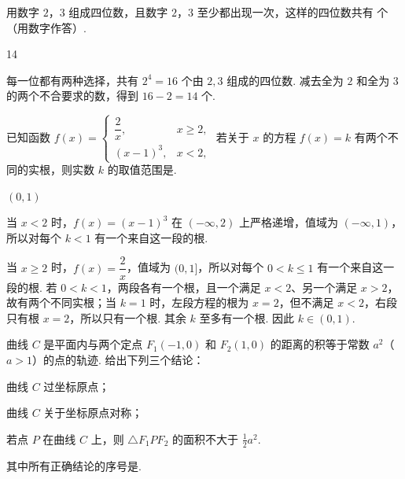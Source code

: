 \begin{problem}
用数字 \(2\)，\(3\) 组成四位数，且数字 \(2\)，\(3\) 至少都出现一次，这样的四位数共有\fillinblank{} 个（用数字作答）.
\end{problem}

\begin{answer}
14
\end{answer}

\begin{solution}
每一位都有两种选择，共有 \(2^4=16\) 个由 \(2,3\) 组成的四位数. 减去全为 \(2\) 和全为 \(3\) 的两个不合要求的数，得到 \(16-2=14\) 个.
\end{solution}

\begin{problem}
已知函数 \(f(x) = \begin{cases}
\dfrac{2}{x}, & x \geqslant 2,\\
(x - 1)^3, & x < 2,
\end{cases}\)
若关于 \(x\) 的方程 \(f(x) = k\) 有两个不同的实根，则实数 \(k\) 的取值范围是\fillinblank{}.
\end{problem}

\begin{answer}
\((0, 1)\)
\end{answer}

\begin{solution}
当 \(x<2\) 时，\(f(x)=(x-1)^3\) 在 \((-\infty,2)\) 上严格递增，值域为 \((-\infty,1)\)，所以对每个 \(k<1\) 有一个来自这一段的根.

当 \(x\geqslant2\) 时，\(f(x)=\dfrac2x\)，值域为 \((0,1]\)，所以对每个 \(0<k\leqslant1\) 有一个来自这一段的根. 若 \(0<k<1\)，两段各有一个根，且一个满足 \(x<2\)、另一个满足 \(x>2\)，故有两个不同实根；当 \(k=1\) 时，左段方程的根为 \(x=2\)，但不满足 \(x<2\)，右段只有根 \(x=2\)，所以只有一个根. 其余 \(k\) 至多有一个根. 因此 \(k\in(0,1)\).
\end{solution}

\begin{problem}
曲线 \(C\) 是平面内与两个定点 \(F_1(-1, 0)\) 和 \(F_2(1, 0)\) 的距离的积等于常数 \(a^2\)（\(a > 1\)）的点的轨迹. 给出下列三个结论：

\begin{circlelist}
\item 曲线 \(C\) 过坐标原点；
\item 曲线 \(C\) 关于坐标原点对称；
\item 若点 \(P\) 在曲线 \(C\) 上，则 \(\triangle F_1PF_2\) 的面积不大于 \(\frac{1}{2}a^2\).
\end{circlelist}

其中所有正确结论的序号是\fillinblank{}.
\end{problem}

